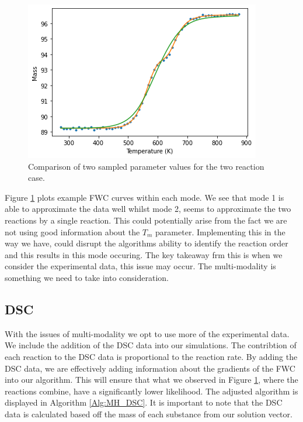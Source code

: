 \begin{figure}[h!]
\includegraphics[scale=1]{figures/bayesian/2_reactions/TGA_comparison.png}
\caption{Comparison of two sampled parameter values for the two reaction case.}
\label{comparison}
\end{figure}

Figure \ref{comparison} plots example FWC curves within each mode. We see that mode 1 is able to approximate the data well whilst mode 2, seems to approximate the two reactions by a single reaction. This could potentially arise from the fact we are not using good information about the $T_m$ parameter. Implementing this in the way we have, could disrupt the algorithms ability to identify the reaction order and this results in this mode occuring. The key takeaway frm this is when we consider the experimental data, this issue may occur. The multi-modality is something we need to take into consideration.

\subsection{DSC}
With the issues of multi-modality we opt to use more of the experimental data. We include the addition of the DSC data into our simulations. The contribtion of each reaction to the DSC data is proportional to the reaction rate. By adding the DSC data, we are effectively adding information about the gradients of the FWC into our algorithm. This will ensure that what we observed in Figure \ref{comparison}, where the reactions combine, have a significantly lower likelihood. The adjusted algorithm is displayed in Algorithm \ref{Alg:MH_DSC}. It is important to note that the DSC data is calculated based off the mass of each substance from our solution vector.\\

